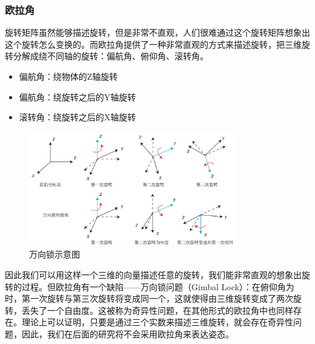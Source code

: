 \subsubsection{欧拉角}
旋转矩阵虽然能够描述旋转，但是非常不直观，人们很难通过这个旋转矩阵想象出这个旋转怎么变换的。而欧拉角提供了一种非常直观的方式来描述旋转，把三维旋转分解成绕不同轴的旋转：偏航角、俯仰角、滚转角。\par
\begin{itemize}
\item 偏航角：绕物体的Z轴旋转
\item 偏航角：绕旋转之后的Y轴旋转
\item 滚转角：绕旋转之后的X轴旋转
\end{itemize}
\begin{figure}[htb]
	\centering
	\includegraphics[height=5cm]{figures/GimbalLock.png}
	\caption{万向锁示意图}
\end{figure}\par
因此我们可以用这样一个三维的向量描述任意的旋转，我们能非常直观的想象出旋转的过程。但欧拉角有一个缺陷——万向锁问题（Gimbal Lock）：在俯仰角为时，第一次旋转与第三次旋转将变成同一个，这就使得由三维旋转变成了两次旋转，丢失了一个自由度。这被称为奇异性问题，在其他形式的欧拉角中也同样存在。理论上可以证明，只要是通过三个实数来描述三维旋转，就会存在奇异性问题，因此，我们在后面的研究将不会采用欧拉角来表达姿态。
